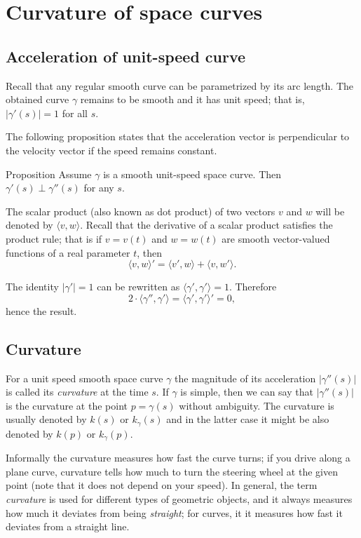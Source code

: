 \chapter{Curvature of space curves}

\section*{Acceleration of unit-speed curve}

Recall that any regular smooth curve can be parametrized by its arc length.
The obtained curve $\gamma$ remains to be smooth and it has unit speed; 
that is, $|\gamma'(s)|=1$ for all $s$.

The following proposition states that the acceleration vector is perpendicular to the velocity vector if the speed remains constant.

\begin{thm}{Proposition}\label{prop:a'-pertp-a''}
Assume $\gamma$ is a smooth unit-speed space curve.
Then $\gamma'(s)\perp \gamma''(s)$ for any $s$.
\end{thm}

The scalar product (also known as dot product) of two vectors $v$ and $w$ will be denoted by $\langle v,w\rangle$.
Recall that the derivative of a scalar product satisfies the product rule;
that is if $v=v(t)$ and $w=w(t)$ are smooth vector-valued functions of a real parameter $t$, then
\[\langle v,w\rangle'=\langle v',w\rangle+\langle v,w'\rangle.\]

The identity $|\gamma'|=1$ can be rewritten as $\langle\gamma',\gamma'\rangle=1$.
Therefore
\[2\cdot\langle\gamma'',\gamma'\rangle=\langle\gamma',\gamma'\rangle'=0,\]
hence the result.
\qeds

\section*{Curvature}

For a unit speed smooth space curve $\gamma$ the magnitude of its acceleration $|\gamma''(s)|$ is called its \emph{curvature} at the time $s$.
If $\gamma$ is simple, then we can say that $|\gamma''(s)|$ is the curvature at the point $p=\gamma(s)$ without ambiguity.
The curvature is usually denoted by $k(s)$ or $k_\gamma(s)$ and in the latter case it might be also denoted by $k(p)$ or $k_\gamma(p)$.

Informally the curvature measures how fast the curve turns;
if you drive along a plane curve, curvature tells how much to turn the steering wheel at the given point (note that it does not depend on your speed).
In general, the term \emph{curvature} is used for different types of geometric objects, and it always measures how much it deviates from being \emph{straight};
for curves, it it measures how fast it deviates from a straight line.

